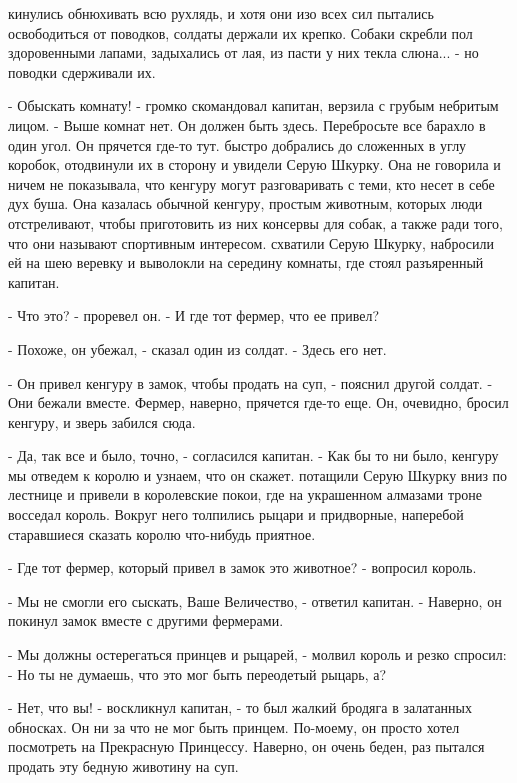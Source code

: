 кинулись обнюхивать всю рухлядь, и хотя они изо всех сил пытались 
освободиться от поводков, солдаты держали их крепко. Собаки скребли 
пол здоровенными лапами, задыхались от лая, из пасти у них текла 
слюна... - но поводки сдерживали их.
\par- Обыскать комнату! - громко скомандовал капитан, верзила с грубым 
небритым лицом. - Выше комнат нет. Он должен быть здесь. Перебросьте 
все барахло в один угол. Он прячется где-то тут.
 быстро добрались до сложенных в углу коробок, отодвинули 
их в сторону и увидели Серую Шкурку. Она не говорила и ничем не 
показывала, что кенгуру могут разговаривать с теми, кто несет в себе 
дух буша. Она казалась обычной кенгуру, простым животным, которых люди 
отстреливают, чтобы приготовить из них консервы для собак, а также 
ради того, что они называют спортивным интересом.
 схватили Серую Шкурку, набросили ей на шею веревку и 
выволокли на середину комнаты, где стоял разъяренный капитан.
\par- Что это? - проревел он. - И где тот фермер, что ее привел?
\par- Похоже, он убежал, - сказал один из солдат. - Здесь его нет.
\par- Он привел кенгуру в замок, чтобы продать на суп, - пояснил 
другой солдат. - Они бежали вместе. Фермер, наверно, прячется где-то 
еще. Он, очевидно, бросил кенгуру, и зверь забился сюда.
\par- Да, так все и было, точно, - согласился капитан. - Как бы то ни 
было, кенгуру мы отведем к королю и узнаем, что он скажет.
 потащили Серую Шкурку вниз по лестнице и привели в 
королевские покои, где на украшенном алмазами троне восседал король. 
Вокруг него толпились рыцари и придворные, наперебой старавшиеся 
сказать королю что-нибудь приятное.
\par- Где тот фермер, который привел в замок это животное? - вопросил 
король.
\par- Мы не смогли его сыскать, Ваше Величество, - ответил капитан. - 
Наверно, он покинул замок вместе с другими фермерами.
\par- Мы должны остерегаться принцев и рыцарей, - молвил король и 
резко спросил: - Но ты не думаешь, что это мог быть переодетый рыцарь, 
а?
\par- Нет, что вы! - воскликнул капитан, - то был жалкий бродяга в 
залатанных обносках. Он ни за что не мог быть принцем. По-моему, он 
просто хотел посмотреть на Прекрасную Принцессу. Наверно, он очень 
беден, раз пытался продать эту бедную животину на суп.

